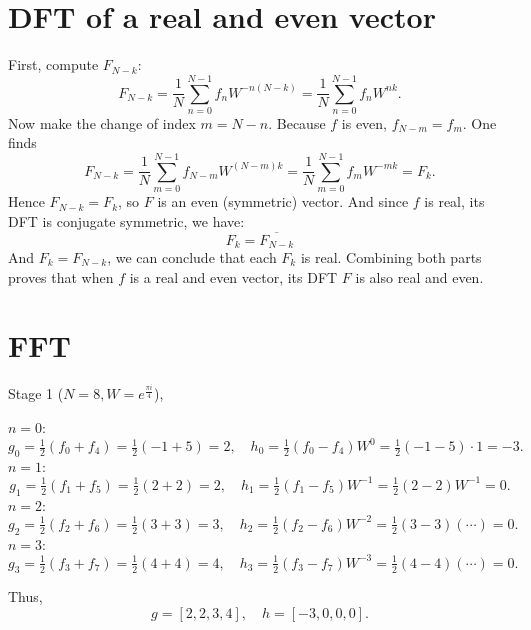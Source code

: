 \documentclass{article}
\begin{document}
\section{DFT of a real and even vector}
First, compute \(F_{N-k}\):
\[
    F_{N-k}
    = \frac{1}{N}\sum_{n=0}^{N-1} f_nW^{-n(N-k)}
    = \frac{1}{N}\sum_{n=0}^{N-1} f_nW^{nk}.
\]
Now make the change of index \(m = N - n\).  Because \(f\) is even, \(f_{N-m} = f_m\).  One finds
\[
    F_{N-k}
    = \frac{1}{N}\sum_{m=0}^{N-1} f_{N-m} W^{(N-m)k}
    = \frac{1}{N}\sum_{m=0}^{N-1} f_m W^{-m k}=F_k.
\]
Hence \(F_{N-k} = F_k\), so \(F\) is an even (symmetric) vector. And since $f$ is real, its DFT is conjugate symmetric, we have:
$$
    F_k=\overline{F_{N-k}}
$$
And $F_k=F_{N-k}$, we can conclude that each $F_k$ is real. Combining both parts proves that when \(f\) is a real and even vector, its DFT \(F\) is also real and even.

\newpage
\section{FFT}
Stage 1 (\(N=8, W=e^{\frac{\pi i}{4}}\)),

\(n=0\):
\[
    g_0 = \tfrac12(f_0 + f_4)
    = \tfrac12(-1 + 5) = 2,
    \quad
    h_0 = \tfrac12(f_0 - f_4) W^{0}
    = \tfrac12(-1 - 5)\cdot 1
    = -3.
\]
\(n=1\):
\[
    g_1 = \tfrac12(f_1 + f_5)
    = \tfrac12(2 + 2) = 2,
    \quad
    h_1 = \tfrac12(f_1 - f_5) W^{-1}
    = \tfrac12(2 - 2) W^{-1}
    = 0.
\]
\(n=2\):
\[
    g_2 = \tfrac12(f_2 + f_6)
    = \tfrac12(3 + 3) = 3,
    \quad
    h_2 = \tfrac12(f_2 - f_6) W^{-2}
    = \tfrac12(3 - 3) (\cdots)
    = 0.
\]
\(n=3\):
\[
    g_3 = \tfrac12(f_3 + f_7)
    = \tfrac12(4 + 4) = 4,
    \quad
    h_3 = \tfrac12(f_3 - f_7) W^{-3}
    = \tfrac12(4 - 4) (\cdots)
    = 0.
\]

Thus,
\[
    g = [ 2, 2, 3, 4 ],
    \quad
    h = [ -3, 0, 0, 0 ].
\]
\end{document}

